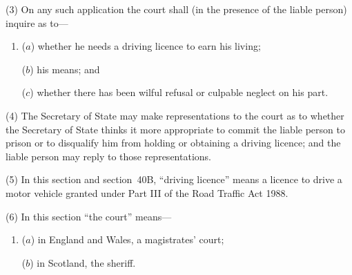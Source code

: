 \documentclass[12pt,a4paper]{article}
\begin{document}
(3) On any such application the court shall (in the presence of the liable person) inquire as to—
\begin{enumerate}\item[]
($a$) whether he needs a driving licence to earn his living;

($b$) his means; and

($c$) whether there has been wilful refusal or culpable neglect on his part.
\end{enumerate}

(4) The 
Secretary of State  %
may make representations to the court as to whether 
the Secretary of State  %
thinks it more appropriate to commit the liable person to prison or to disqualify him from holding or obtaining a driving licence; and the liable person may reply to those representations.

(5) In this section and section~40B, “driving licence” means a licence to drive a motor vehicle granted under Part III of the Road Traffic Act 1988. 

(6) In this section “the court” means—
\begin{enumerate}\item[]
($a$) in England and Wales, a magistrates' court;

($b$) in Scotland, the sheriff.
\end{enumerate}
\end{document}
